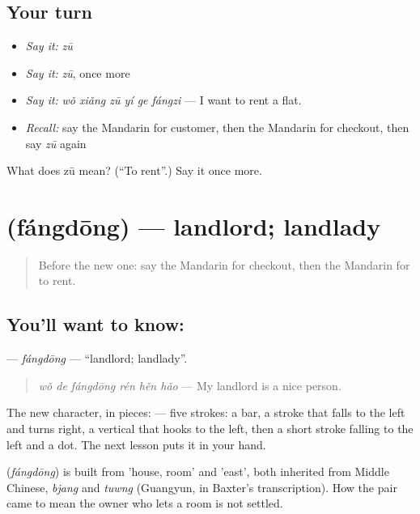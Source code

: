 \subsection*{Your turn}
\begin{itemize}
\raggedright
  \item \emph{Say it:} \emph{zū}
  \item \emph{Say it:} \emph{zū}, once more
  \item \emph{Say it:} \emph{wǒ xiǎng zū yí ge fángzi} — I want to rent a flat.
  \item \emph{Recall:} say the Mandarin for customer, then the Mandarin for checkout, then say \emph{zū} again
\end{itemize}

\begin{tcolorbox}[breakable,colback=teal!4,colframe=teal!35!black,title={Before you move on}]
What does zū mean? (\textquotedblleft{}To rent\textquotedblright{}.) Say it once more.
\end{tcolorbox}
\section[\texorpdfstring{\zh{房东} (fángdōng)}{房东 (fángdōng)}]{ (fángdōng) — landlord; landlady}

\label{lesson:ZH-C203-fangdong}



\begin{quote}
Before the new one: say the Mandarin for checkout, then the Mandarin for to rent.
\end{quote}

\subsection*{You'll want to know: }
\textbf{} — \emph{fángdōng} — \textquotedblleft{}landlord; landlady\textquotedblright{}.

\begin{quote}
\textbf{} \emph{wǒ de fángdōng rén hěn hǎo} — My landlord is a nice person.
\end{quote}

The new character, in pieces:  — five strokes: a bar, a stroke that falls to the left and turns right, a vertical that hooks to the left, then a short stroke falling to the left and a dot. The next lesson puts it in your hand.

\begin{cousinweb}
\textbf{} (\emph{fángdōng}) is built from  'house, room' and  'east', both inherited from Middle Chinese, \emph{bjang} and \emph{tuwng} (Guangyun, in Baxter's transcription). How the pair came to mean the owner who lets a room is not settled.
\end{cousinweb}


